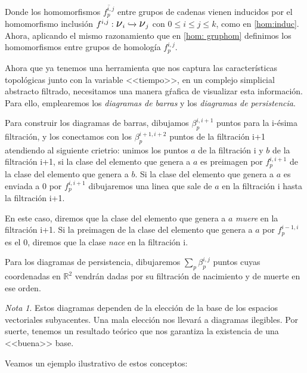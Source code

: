 \documentclass[12pt, a4paper]{article}
\numberwithin{equation}{section}
\theoremstyle{definition}
\theoremstyle{remark}
\newtheorem*{remark}{Nota}
\theoremstyle{plain}
\begin{document}
	Donde los homomorfismos $\overline{f_{p}^{i,j}}$ entre grupos de 
	cadenas vienen inducidos por el homomorfismo inclusión $f^{i,j}: 
	\text{{\Large $\nu$}$_{i}$} \xhookrightarrow{} 
	\text{{\Large $\nu$}$_{j}$}$ con $0\leq i \leq j \leq k$, como en 
	\ref{hom:induc}. Ahora, aplicando el mismo razonamiento que en 
	\ref{hom: gruphom} definimos los homomorfismos entre grupos de 
	homología $f^{i,j}_{p}$.

	Ahora que ya tenemos una herramienta que nos captura las 
	características topológicas junto con la variable <<tiempo>>, en un 
	complejo simplicial abstracto filtrado, necesitamos una manera gŕafica 
	de visualizar esta información. Para ello, emplearemos los  
	\emph{diagramas de barras} y los \emph{diagramas de persistencia}.
	
	Para construir los diagramas de barras, dibujamos $\beta_{p}^{i,i+1}$ 
	puntos para la i-ésima filtración, y los conectamos con los 
	$\beta_{p}^{i+1,i+2}$ puntos de la filtración i+1 atendiendo al 
	siguiente crietrio: unimos los puntos $a$ de la filtración i y $b$ de
	la filtración i+1, si la clase del elemento que genera a $a$ es 
	preimagen por $f_{p}^{i,i+1}$ de la clase del elemento que genera a 
	$b$. Si la clase del elemento que genera a $a$ es enviada a 0 por 
	$f_{p}^{i,i+1}$ dibujaremos una linea que sale de $a$ en la filtración
	i hasta la filtración i+1. 

	En este caso, diremos que la clase del 
	elemento que genera a $a$ \emph{muere} en la filtración i+1. Si la 
	preimagen de la clase del elemento que genera a $a$ por 
	$f_{p}^{i-1,i}$ es el 0, diremos que la clase \emph{nace} en la 
	filtración i.

	Para los diagramas de persistencia, dibujaremos $\sum_{p}
	\beta_{p}^{i,j}$ puntos cuyas coordenadas en $\mathbb{R}^{2}$ vendrán 
	dadas por su filtración de nacimiento y de muerte en ese orden. 

	\begin{remark}
		Estos diagramas dependen de la elección de la base de los 
		espacios vectoriales subyacentes. Una mala elección nos 
		llevará a diagramas ilegibles. Por suerte, tenemos un 
		resultado teórico que nos garantiza la existencia de una 
		<<buena>> base.
	\end{remark}

	Veamos un ejemplo ilustrativo de estos conceptos:
\end{document}
